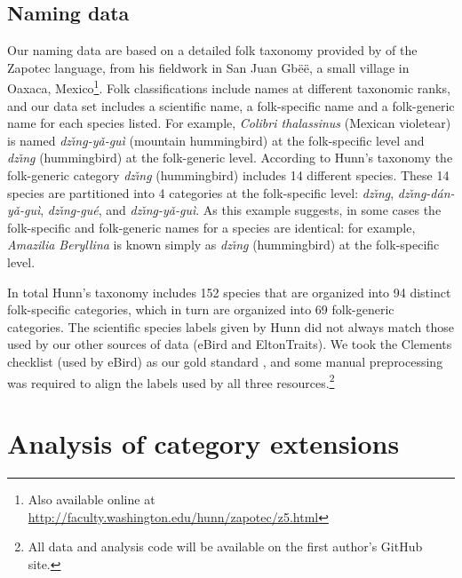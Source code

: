 \documentclass[10pt,letterpaper]{article}
\begin{document}
\subsection{Naming data}

Our naming data are based on a detailed folk taxonomy provided by  of the Zapotec language, from his fieldwork in San Juan Gb\"{e}\"{e}, a small village in Oaxaca, Mexico\footnote{ Also available online at \url{http://faculty.washington.edu/hunn/zapotec/z5.html}}. Folk classifications include names at different taxonomic ranks, and our data set includes a scientific name,  a folk-specific name and a folk-generic name for each species listed. For example, \emph{ Colibri thalassinus} (Mexican violetear) is named \textit{dz\v{\i}n\b{g}-y\v{a}-gu\`{i}} (mountain hummingbird) at the folk-specific level and \textit{dz\v{\i}n\b{g}} (hummingbird) at the folk-generic level.  According to Hunn's taxonomy the folk-generic category \textit{dz\v{\i}n\b{g}} (hummingbird) includes 14 different species. These 14 species are partitioned into 4 categories at the folk-specific level: \textit{dz\v{\i}n\b{g}}, \textit{dz\v{\i}n\b{g}-d\'{a}n-y\v{a}-gu\`{i}}, \textit{dz\v{\i}n\b{g}-gu\'{e}}, and \textit{dz\v{\i}n\b{g}-y\v{a}-gu\`{i}}.
As this example suggests, in some cases the folk-specific and folk-generic names for a species are identical: for example, 
 \emph{ Amazilia Beryllina} is known simply as \textit{dz\v{\i}n\b{g}} (hummingbird) at the folk-specific level.  %

In total Hunn's taxonomy includes 152 species that are organized into 94 distinct folk-specific categories, which in turn are organized into 69 folk-generic categories.  The scientific species labels given by Hunn did not always match those used by our other sources of data (eBird and EltonTraits).  We took the Clements checklist (used by eBird) as our gold standard \cite{clements2007clements}, and some manual preprocessing was required to align the labels used by all three resources.\footnote{All data and analysis code will be available on the first author's GitHub site.}



\section{Analysis of category extensions}
\end{document}
